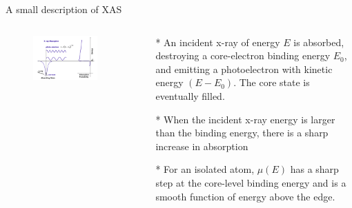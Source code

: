\documentclass{beamer}
\begin{document}
  \begin{frame}{A small description of XAS}
  \begin{columns}
    \begin{column}{0.5\textwidth}
    	  \begin{figure}
    	    \centering
    	    \includegraphics[width=1.2\textwidth]{../Kuvat/absorption1.png}
    	  \end{figure}
    \end{column}
    
    \begin{column}{0.5\textwidth}
      \begin{itemize}
        \item[*] \footnotesize{An incident x-ray of energy $E$ is absorbed, destroying a core-electron binding energy $E_0$, and emitting a photoelectron with kinetic energy $(E-E_0)$. The core state is eventually filled.} 
        \item[*] \footnotesize{When the incident x-ray energy is larger than the binding energy, there is a sharp increase in absorption}
        \item[*] \footnotesize{For an isolated atom, $\mu(E)$ has a sharp step at the core-level binding energy and is a smooth function of energy above the edge.}
      \end{itemize}
    \end{column}
  \end{columns}
  \end{frame}
  
\end{document}
